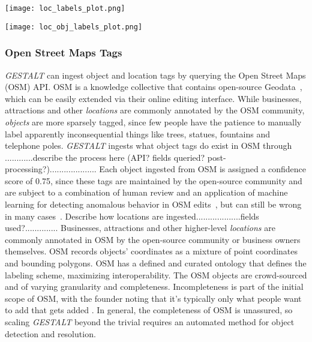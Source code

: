 \begin{figure*}[ht]
    \label{fig:loc}        
    \texttt{[image: loc\_labels\_plot.png]}
    \centering
    \caption[width=\textwidth]{............}
\end{figure*}


\begin{figure*}[ht]
    \label{fig:loc-obj}        
    \texttt{[image: loc\_obj\_labels\_plot.png]}
    \centering
    \caption[width=\textwidth]{............}
\end{figure*}


\subsubsection{Open Street Maps Tags}
\emph{GESTALT} can ingest object and location tags by querying the Open Street Maps (OSM) API.
OSM is a knowledge collective that contains open-source Geodata~\cite{Haklay2008}, which can be easily extended via their online editing interface.
While businesses, attractions and other \textit{locations} are commonly annotated by the OSM community, \textit{objects} are more sparsely tagged, since few people have the patience to manually label apparently inconsequential things like trees, statues, fountains and telephone poles. 
\emph{GESTALT} ingests what object tags do exist in OSM through 
............describe the process here (API? fields queried? post-processing?)....................
Each object ingested from OSM is assigned a confidence score of 0.75, since these tags are maintained by the open-source community and are subject to a combination of human review and an application of machine learning for detecting anomalous behavior in OSM edits~\cite{Mooney2017}, but can still be wrong in many cases~\cite{VargasMunoz2020}.
Describe how locations are ingested...................fields used?..............%
Businesses, attractions and other higher-level \textit{locations} are commonly annotated in OSM by the open-source community or business owners themselves.
OSM records objects' coordinates as a mixture of point coordinates and bounding polygons. 
OSM has a defined and curated ontology that defines the labeling scheme, maximizing interoperability. 
The OSM objects are crowd-sourced and of varying granularity and completeness. Incompleteness is part of the initial scope of OSM, with the founder noting that it's typically only what people want to add that gets added \cite{Haklay2008}.
In general, the completeness of OSM is unassured, so scaling \textit{GESTALT} beyond the trivial requires an automated method for object detection and resolution. 


